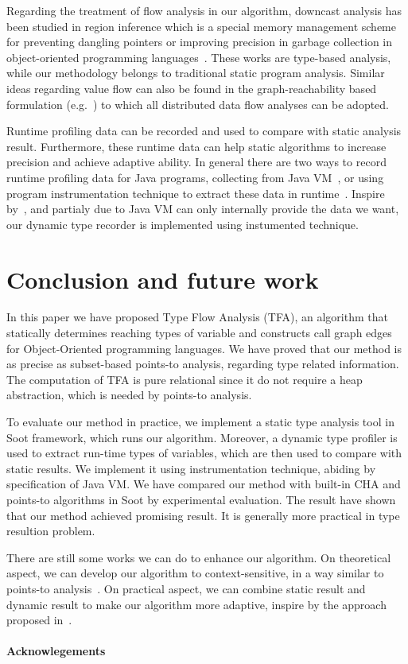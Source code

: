 \documentclass{fac}
\begin{document}
Regarding the treatment of flow analysis in our algorithm, downcast analysis has been studied in region inference which is a special memory management scheme for preventing dangling pointers or improving precision in garbage collection in object-oriented programming languages~\cite{Boyapati2003,Chin2004}.  These works are type-based analysis, while our methodology belongs to traditional static program analysis. Similar ideas regarding value flow can also be found in the graph-reachability based formulation (e.g.~\cite{Reps1997,Lu2013}) to which all distributed data flow analyses can be adopted.

Runtime profiling data can be recorded and used to compare with static analysis result. Furthermore, these runtime data can help static algorithms to increase precision and achieve adaptive ability. In general there are two ways to record runtime profiling data for Java programs, collecting from Java VM~\cite{Codrut2014}, or using program instrumentation technique to extract these data in runtime~\cite{Sundaresan2000}. Inspire by~\cite{Sundaresan2000}, and partialy due to Java VM can only internally provide the data we want, our dynamic type recorder is implemented using instumented technique.

\section{Conclusion and future work}\label{sec:conclusion}
In this paper we have proposed Type Flow Analysis (TFA), an algorithm that statically determines reaching types of variable and constructs call graph edges for Object-Oriented programming languages. We have proved that our method is as precise as subset-based points-to analysis, regarding type related information. The computation of TFA is pure relational since it do not require a heap abstraction, which is needed by points-to analysis.

To evaluate our method in practice, we implement a static type analysis tool in Soot framework, which runs our algorithm. Moreover, a dynamic type profiler is used to extract run-time types of variables, which are then used to compare with static results. We implement it using instrumentation technique, abiding by specification of Java VM. We have compared our method with built-in CHA and points-to algorithms in Soot by experimental evaluation. The result have shown that our method achieved promising result. It is generally more practical in type resultion problem.

There are still some works we can do to enhance our algorithm. On theoretical aspect, we can develop our algorithm to context-sensitive, in a way similar to points-to analysis~\cite{Milanova2005,Smaragdakis11}. On practical aspect, we can combine static result and dynamic result to make our algorithm more adaptive, inspire by the approach proposed in~\cite{Codrut2014}.

\paragraph{Acknowlegements}
\label{lastpage}



\end{document}
